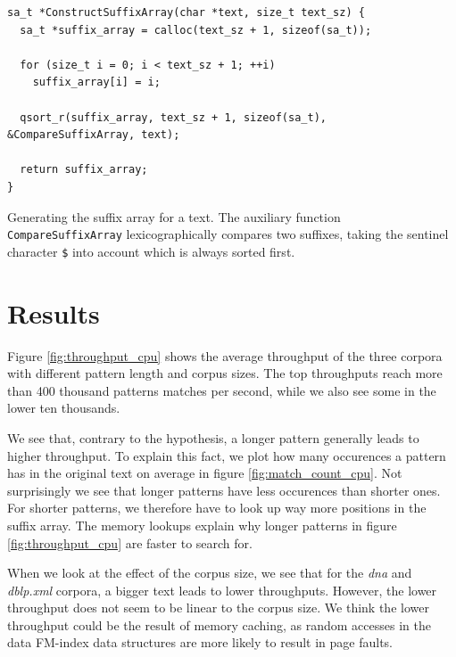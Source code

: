 \begin{listing}[H]
\begin{verbatim}
sa_t *ConstructSuffixArray(char *text, size_t text_sz) {
  sa_t *suffix_array = calloc(text_sz + 1, sizeof(sa_t));

  for (size_t i = 0; i < text_sz + 1; ++i)
    suffix_array[i] = i;

  qsort_r(suffix_array, text_sz + 1, sizeof(sa_t), &CompareSuffixArray, text);

  return suffix_array;
}
\end{verbatim}
\caption{Generating the suffix array for a text. The auxiliary function \texttt{CompareSuffixArray} lexicographically compares two suffixes, taking the sentinel character \texttt{\$} into account which is always sorted first.}
\label{listing:construct_sa}
\end{listing}



\section{Results} \label{section:results_cpu}

Figure \ref{fig:throughput_cpu} shows the average throughput of the three corpora with different pattern length and corpus sizes.
The top throughputs reach more than 400 thousand patterns matches per second, while we also see some in the lower ten thousands.

We see that, contrary to the hypothesis, a longer pattern generally leads to higher throughput.
To explain this fact, we plot how many occurences a pattern has in the original text on average in figure \ref{fig:match_count_cpu}.
Not surprisingly we see that longer patterns have less occurences than shorter ones.
For shorter patterns, we therefore have to look up way more positions in the suffix array.
The memory lookups explain why longer patterns in figure \ref{fig:throughput_cpu} are faster to search for.

When we look at the effect of the corpus size, we see that for the \textit{dna} and \textit{dblp.xml} corpora, a bigger text leads to lower throughputs.
However, the lower throughput does not seem to be linear to the corpus size.
We think the lower throughput could be the result of memory caching, as random accesses in the data FM-index data structures are more likely to result in page faults.


